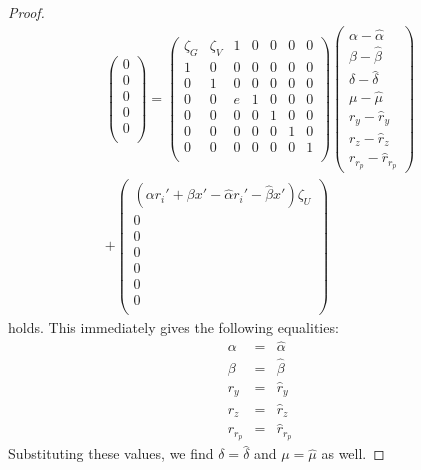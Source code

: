 \documentclass{article}
\theoremstyle{definition}
\newcommand{\wh}[1]{\widehat{#1}}
\begin{document}
\begin{proof}
\begin{multline*}
\begin{pmatrix}
			0 \\
			0 \\
			0 \\
			0 \\
			0 \\
		\end{pmatrix}
		=
		\begin{pmatrix}
			\zeta_G & \zeta_V & 1 & 0 & 0 & 0 & 0 \\
			1 & 0 & 0 & 0 & 0 & 0 & 0 \\
			0 & 1 & 0 & 0 & 0 & 0 & 0 \\
			0 & 0 & e & 1 & 0 & 0 & 0 \\
			0 & 0 & 0 & 0 & 1 & 0 & 0 \\
			0 & 0 & 0 & 0 & 0 & 1 & 0 \\
			0 & 0 & 0 & 0 & 0 & 0 & 1 \\
		\end{pmatrix}
		\begin{pmatrix}
			\alpha - \wh{\alpha} \\
			\beta - \wh{\beta} \\
			\delta - \wh{\delta} \\
			\mu - \wh{\mu} \\
			r_y - \wh{r}_y \\
			r_z - \wh{r}_z \\
			r_{r_p} - \wh{r}_{r_p}
		\end{pmatrix} \\
		+
		\begin{pmatrix}
			(\alpha r_i' + \beta x' - \wh{\alpha} r_i' - \wh{\beta} x') \zeta_U \\
			0 \\
			0 \\
			0 \\
			0 \\
			0 \\
			0 \\
		\end{pmatrix}
	\end{multline*}
	holds.
	This immediately gives the following equalities:
	\begin{eqnarray*}
	\alpha &=& \wh{\alpha} \\
	\beta &=& \wh{\beta} \\
	r_y &=& \wh{r}_y \\
	r_z &=& \wh{r}_z \\
	r_{r_p} &=& \wh{r}_{r_p}
	\end{eqnarray*}
	Substituting these values, we find $\delta = \wh{\delta}$ and $\mu = \wh{\mu}$ as well.


\end{proof}
\end{document}
